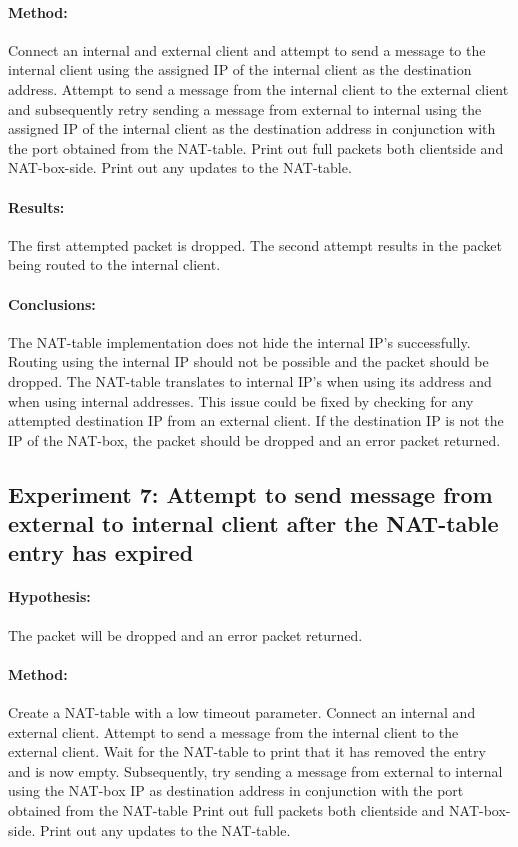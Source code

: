 \documentclass[12pt, a4paper]{article}
\begin{document}
\paragraph{Method:}
Connect an internal and external client and attempt to send a message to the internal client using the assigned IP of the internal client as the destination address. Attempt to send a message from the internal client to the external client and subsequently retry sending a message from external to internal using the assigned IP of the internal client as the destination address in conjunction with the port obtained from the NAT-table. Print out full packets both clientside and NAT-box-side. Print out any updates to the NAT-table.
\paragraph{Results:}
The first attempted packet is dropped. The second attempt results in the packet being routed to the internal client.
\paragraph{Conclusions:}
The NAT-table implementation does not hide the internal IP's successfully. Routing using the internal IP should not be possible and the packet should be dropped. The NAT-table translates to internal IP's when using its address and when using internal addresses. This issue could be fixed by checking for any attempted destination IP from an external client. If the destination IP is not the IP of the NAT-box, the packet should be dropped and an error packet returned.

\subsection{Experiment 7: Attempt to send message from external to internal client after the NAT-table entry has expired}
\paragraph{Hypothesis:}
The packet will be dropped and an error packet returned.
\paragraph{Method:}
Create a NAT-table with a low timeout parameter. Connect an internal and external client. Attempt to send a message from the internal client to the external client. Wait for the NAT-table to print that it has removed the entry and is now empty. Subsequently, try sending a message from external to internal using the NAT-box IP as destination address in conjunction with the port obtained from the NAT-table Print out full packets both clientside and NAT-box-side. Print out any updates to the NAT-table.
\end{document}
